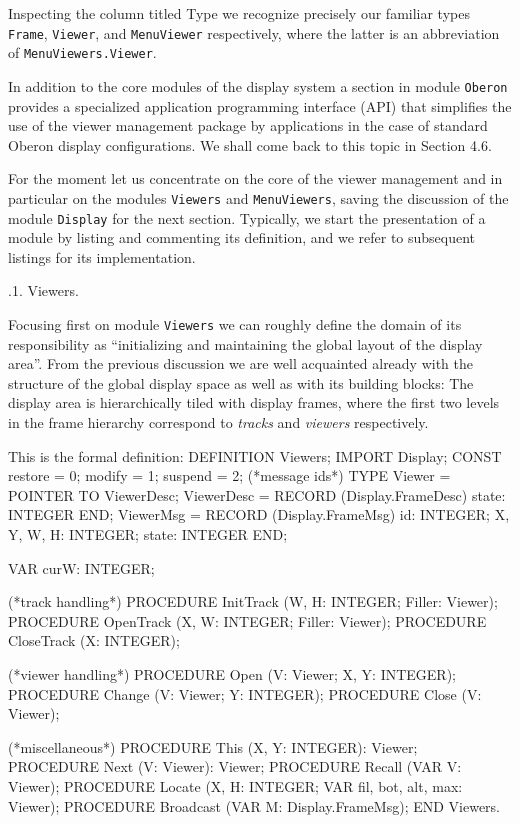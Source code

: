 Inspecting the column titled Type we recognize precisely our familiar
types {\tt Frame\/}, {\tt Viewer\/}, and {\tt MenuViewer\/} respectively, where the latter is
an abbreviation of {\tt MenuViewers.Viewer\/}.

In addition to the core modules of the display system a section in
module {\tt Oberon\/} provides a specialized application programming interface
(API) that simplifies the use of the viewer management package by
applications in the case of standard Oberon display configurations. We
shall come back to this topic in Section 4.6.

For the moment let us concentrate on the core of the viewer management
and in particular on the modules {\tt Viewers\/} and {\tt MenuViewers\/}, saving the
discussion of the module {\tt Display\/} for the next section. Typically, we
start the presentation of a module by listing and commenting its
definition, and we refer to subsequent listings for its
implementation.

.1. Viewers.


Focusing first on module {\tt Viewers\/} we can roughly define the domain of
its responsibility as ``initializing and maintaining the global layout
of the display area''. From the previous discussion we are well
acquainted already with the structure of the global display space as
well as with its building blocks: The display area is hierarchically
tiled with display frames, where the first two levels in the frame
hierarchy correspond to {\it tracks\/} and {\it viewers\/} respectively.

This is the formal definition:
\begintt
DEFINITION Viewers;
  IMPORT Display;
  CONST restore = 0; modify = 1; suspend = 2; (*message ids*)
  TYPE Viewer = POINTER TO ViewerDesc;
       ViewerDesc = RECORD (Display.FrameDesc)
         state: INTEGER
       END;
       ViewerMsg = RECORD (Display.FrameMsg)
         id: INTEGER;
         X, Y, W, H: INTEGER;
         state: INTEGER
       END;

  VAR curW: INTEGER;
       
  (*track handling*)
  PROCEDURE InitTrack (W, H: INTEGER; Filler: Viewer);
  PROCEDURE OpenTrack (X, W: INTEGER; Filler: Viewer);
  PROCEDURE CloseTrack (X: INTEGER);

  (*viewer handling*)
  PROCEDURE Open (V: Viewer; X, Y: INTEGER);
  PROCEDURE Change (V: Viewer; Y: INTEGER);
  PROCEDURE Close (V: Viewer);

  (*miscellaneous*)
  PROCEDURE This (X, Y: INTEGER): Viewer;
  PROCEDURE Next (V: Viewer): Viewer;
  PROCEDURE Recall (VAR V: Viewer);
  PROCEDURE Locate (X, H: INTEGER; VAR fil, bot, alt, max: Viewer);
  PROCEDURE Broadcast (VAR M: Display.FrameMsg);
END Viewers.
\endtt

